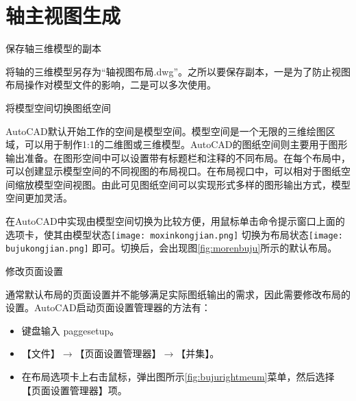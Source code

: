 \section{轴主视图生成}
\begin{procedure}
\item 保存轴三维模型的副本

将轴的三维模型另存为“轴视图布局.dwg”。之所以要保存副本，一是为了防止视图布局操作对模型文件的影响，二是可以多次使用。


\item 将模型空间切换图纸空间

AutoCAD默认开始工作的空间是模型空间。模型空间是一个无限的三维绘图区域，可以用于制作1:1的二维图或三维模型。AutoCAD的图纸空间则主要用于图形输出准备。在图形空间中可以设置带有标题栏和注释的不同布局。在每个布局中，可以创建显示模型空间的不同视图的布局视口。在布局视口中，可以相对于图纸空间缩放模型空间视图。由此可见图纸空间可以实现形式多样的图形输出方式，模型空间更加灵活。

在AutoCAD中实现由模型空间切换为比较方便，用鼠标单击命令提示窗口上面的选项卡，使其由模型状态\texttt{[image: moxinkongjian.png]} 切换为布局状态\texttt{[image: bujukongjian.png]} 即可。切换后，会出现图\ref{fig:morenbuju}所示的默认布局。

\begin{figure}[htbp]
\centering
\begin{floatrow}[2]
\end{floatrow}
\end{figure}

\item 修改页面设置

通常默认布局的页面设置并不能够满足实际图纸输出的需求，因此需要修改布局的设置。AutoCAD启动页面设置管理器的方法有：
\begin{itemize}
\item 键盘输入 paggesetup。
\item 【文件】$\rightarrow$【页面设置管理器】$\rightarrow$【并集】。
\item 在布局选项卡上右击鼠标，弹出图所示\ref{fig:bujurightmeum}菜单，然后选择【页面设置管理器】项。
\end{itemize}


\end{procedure}
